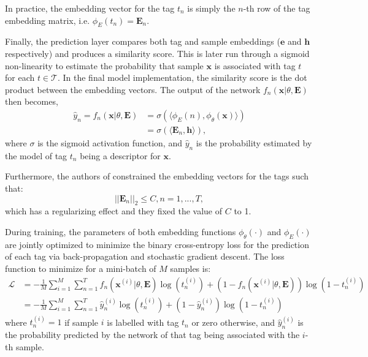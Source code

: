 \documentclass[pdfa%
,cucitura%
]{toptesi}
\begin{document}
In practice, the embedding vector for the tag $t_n$ is simply the $n$-th row of the tag embedding matrix, i.e. $\phi_E(t_n) = \textbf{E}_n$.

Finally, the prediction layer compares both tag and sample embeddings ($\textbf{e}$ and $\textbf{h}$ respectively) and produces a similarity score. This is later run through a sigmoid non-linearity to estimate the probability that sample $\textbf{x}$ is associated with tag $t$ for each $t \in \mathcal{T}$. In the final model implementation, the similarity score is the dot product between the embedding vectors. The output of the network $f_n(\textbf{x} | \theta, \textbf{E})$ then becomes,
\begin{equation}
	\begin{split} \label{eq:jointEmbeddingProbability}
		\hat{y}_n = f_n(\textbf{x} | \theta, \textbf{E}) & = \sigma(\langle\phi_E(n), \phi_\theta(\textbf{x})\rangle) \\ & = \sigma(\langle\textbf{E}_n, \textbf{h}\rangle),
	\end{split}
\end{equation}
where $\sigma$ is the sigmoid activation function, and $\hat{y}_n$ is the probability estimated by the model of tag $t_n$ being a descriptor for $\textbf{x}$.

Furthermore, the authors of \cite{DucauAMDATSE} constrained the embedding vectors for the tags such that:
\begin{equation}
	||\textbf{E}_n||_2 \leq C, n = 1, ..., T,
\end{equation}
which has a regularizing effect and they fixed the value of $C$ to 1.

During training, the parameters of both embedding functions $\phi_\theta(\cdot)$ and $\phi_E(\cdot)$ are jointly optimized to minimize the binary cross-entropy loss for the prediction of each tag via back-propagation and stochastic gradient descent. The loss function to minimize for a mini-batch of $M$ samples is:
\begin{equation} \label{eq:jointEmbeddingLoss}
	\begin{split}
		\mathcal{L} & = -\frac{1}{M} \sum_{i = 1}^{M} \sum_{n = 1}^{T} f_n(\textbf{x}^{(i)} | \theta, \textbf{E}) \log(t_n^{(i)}) + (1 - f_n(\textbf{x}^{(i)} | \theta, \textbf{E})) \log(1 - t_n^{(i)}) \\ & = -\frac{1}{M} \sum_{i = 1}^{M} \sum_{n = 1}^{T} \hat{y}_n^{(i)} \log(t_n^{(i)}) + (1 - \hat{y}_n^{(i)}) \log(1 - t_n^{(i)})
	\end{split}
\end{equation}
where $t_n^{(i)} = 1$ if sample $i$ is labelled with tag $t_n$ or zero otherwise, and $\hat{y}_n^{(i)}$ is the probability predicted by the network of that tag being associated with the $i$-th sample.
\end{document}
